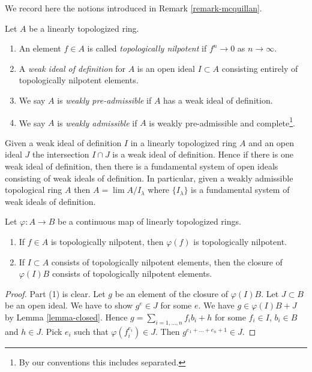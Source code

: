 \medskip\noindent
We record here the notions introduced in Remark \ref{remark-mcquillan}.

\begin{definition}
\label{definition-weakly-admissible}
Let $A$ be a linearly topologized ring.
\begin{enumerate}
\item An element $f \in A$ is called {\it topologically nilpotent}
if $f^n \to 0$ as $n \to \infty$.
\item A {\it weak ideal of definition} for $A$ is an open ideal
$I \subset A$ consisting entirely of topologically nilpotent elements.
\item We say $A$ is {\it weakly pre-admissible} if $A$ has a weak
ideal of definition.
\item We say $A$ is {\it weakly admissible} if $A$ is weakly pre-admissible
and complete\footnote{By our conventions this includes separated.}.
\end{enumerate}
\end{definition}

\noindent
Given a weak ideal of definition $I$ in a linearly topologized ring
$A$ and an open ideal $J$ the intersection $I \cap J$ is a
weak ideal of definition. Hence if there is one weak ideal of definition,
then there is a fundamental system of open ideals
consisting of weak ideals of definition. In particular,
given a weakly admissible topological ring $A$ then
$A = \lim A/I_\lambda$ where $\{I_\lambda\}$ is a fundamental system
of weak ideals of definition.

\begin{lemma}
\label{lemma-topologically-nilpotent}
Let $\varphi : A \to B$ be a continuous map of linearly topologized rings.
\begin{enumerate}
\item If $f \in A$ is topologically nilpotent, then $\varphi(f)$ is
topologically nilpotent.
\item If $I \subset A$ consists of topologically nilpotent elements,
then the closure of $\varphi(I)B$ consists of topologically nilpotent
elements.
\end{enumerate}
\end{lemma}

\begin{proof}
Part (1) is clear. Let $g$ be an element of the closure of $\varphi(I)B$.
Let $J \subset B$ be an open ideal. We have to show $g^e \in J$ for some $e$.
We have $g \in \varphi(I)B + J$ by Lemma \ref{lemma-closed}.
Hence $g = \sum_{i = 1, \ldots, n} f_ib_i + h$ for some $f_i \in I$,
$b_i \in B$ and $h \in J$. Pick $e_i$ such that
$\varphi(f_i^{e_i}) \in J$. Then $g^{e_1 + \ldots + e_n + 1} \in J$.
\end{proof}

